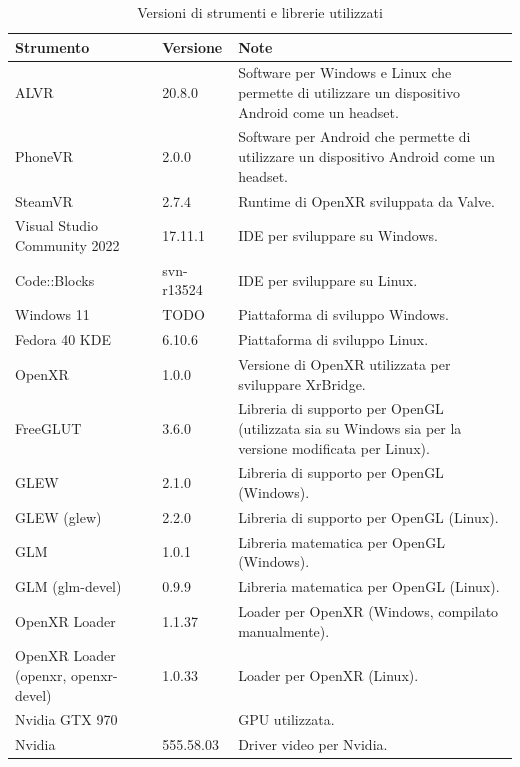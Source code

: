 \documentclass[twoside]{supsistudent}
\begin{document}
\begin{table}[H]
  \caption{Versioni di strumenti e librerie utilizzati}
  \begin{center}
    \begin{tabular}{ m{4cm} m{2cm} m{7cm} }
      Strumento & Versione & Note \\
      \hline
      ALVR & 20.8.0 & Software per Windows e Linux che permette di utilizzare un dispositivo Android come un headset. \\
      PhoneVR & 2.0.0 & Software per Android che permette di utilizzare un dispositivo Android come un headset. \\
      SteamVR & 2.7.4 & Runtime di OpenXR sviluppata da Valve. \\
      Visual Studio Community 2022 & 17.11.1 & IDE per sviluppare su Windows. \\
      Code::Blocks & svn-r13524 & IDE per sviluppare su Linux. \\
      Windows 11 & TODO & Piattaforma di sviluppo Windows. \\
      Fedora 40 KDE & 6.10.6 & Piattaforma di sviluppo Linux. \\
      OpenXR & 1.0.0 & Versione di OpenXR utilizzata per sviluppare XrBridge. \\
      FreeGLUT & 3.6.0 & Libreria di supporto per OpenGL (utilizzata sia su Windows sia per la versione modificata per Linux). \\
      GLEW & 2.1.0 & Libreria di supporto per OpenGL (Windows). \\
      GLEW (glew) & 2.2.0 & Libreria di supporto per OpenGL (Linux). \\
      GLM & 1.0.1 & Libreria matematica per OpenGL (Windows).\\
      GLM (glm-devel) & 0.9.9 & Libreria matematica per OpenGL (Linux). \\
      OpenXR Loader & 1.1.37 & Loader per OpenXR (Windows, compilato manualmente). \\
      OpenXR Loader (openxr, openxr-devel) & 1.0.33 & Loader per OpenXR (Linux). \\
      Nvidia GTX 970 & & GPU utilizzata. \\
      Nvidia & 555.58.03 & Driver video per Nvidia. \\
    \end{tabular}
  \end{center}
\end{table}
\end{document}
